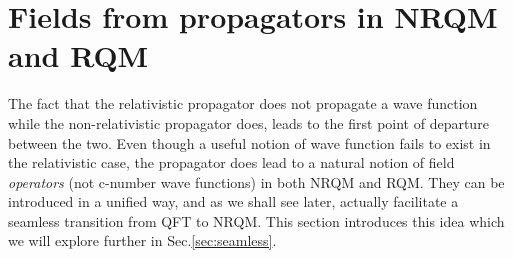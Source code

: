 \documentclass{article}
\begin{document}
 
 \section{Fields from propagators in NRQM and RQM}\label{sec:ffrpr}
 
 The fact that the relativistic propagator does not propagate a wave function while the non-relativistic propagator does, leads to the first point of departure between the two. Even though a useful notion of wave function fails to exist in the relativistic case, the propagator does lead to a natural notion of field \textit{operators} (not c-number wave functions) in both NRQM and RQM. They can be introduced in a unified way, and as we shall see later, actually facilitate a seamless transition from QFT to NRQM. This section introduces this idea which we will explore further in Sec.\ref{sec:seamless}. 
 
\end{document}
